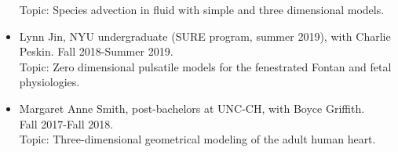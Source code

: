 \documentclass{article} %
\begin{document}
\begin{itemize}
Topic: Species advection in fluid with simple and three dimensional models.
\item Lynn Jin, NYU undergraduate (SURE program, summer 2019), with Charlie Peskin. Fall 2018-Summer 2019. \\  Topic: Zero dimensional pulsatile models for the fenestrated Fontan and fetal physiologies.
\item Margaret Anne Smith, post-bachelors at UNC-CH, with Boyce Griffith. \\Fall 2017-Fall 2018. \\
Topic: Three-dimensional geometrical modeling of the adult human heart.
\end{itemize}
\end{document}
